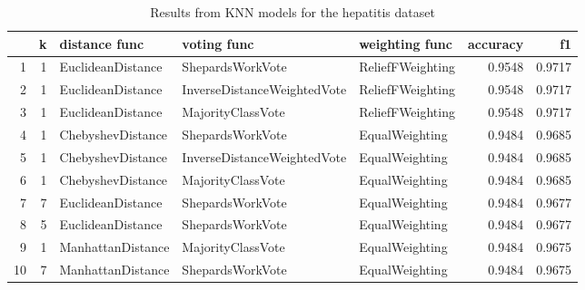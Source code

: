 \begin{table}
\caption{Results from KNN models for the hepatitis dataset}
\label{tab:knn_results_hepatitis}
\begin{tabular}{rrlllrr}
\toprule
 & k & distance func & voting func & weighting func & accuracy & f1 \\
\midrule
1 & 1 & EuclideanDistance & ShepardsWorkVote & ReliefFWeighting & 0.9548 & 0.9717 \\
2 & 1 & EuclideanDistance & InverseDistanceWeightedVote & ReliefFWeighting & 0.9548 & 0.9717 \\
3 & 1 & EuclideanDistance & MajorityClassVote & ReliefFWeighting & 0.9548 & 0.9717 \\
4 & 1 & ChebyshevDistance & ShepardsWorkVote & EqualWeighting & 0.9484 & 0.9685 \\
5 & 1 & ChebyshevDistance & InverseDistanceWeightedVote & EqualWeighting & 0.9484 & 0.9685 \\
6 & 1 & ChebyshevDistance & MajorityClassVote & EqualWeighting & 0.9484 & 0.9685 \\
7 & 7 & EuclideanDistance & ShepardsWorkVote & EqualWeighting & 0.9484 & 0.9677 \\
8 & 5 & EuclideanDistance & ShepardsWorkVote & EqualWeighting & 0.9484 & 0.9677 \\
9 & 1 & ManhattanDistance & MajorityClassVote & EqualWeighting & 0.9484 & 0.9675 \\
10 & 7 & ManhattanDistance & ShepardsWorkVote & EqualWeighting & 0.9484 & 0.9675 \\
\bottomrule
\end{tabular}
\end{table}

